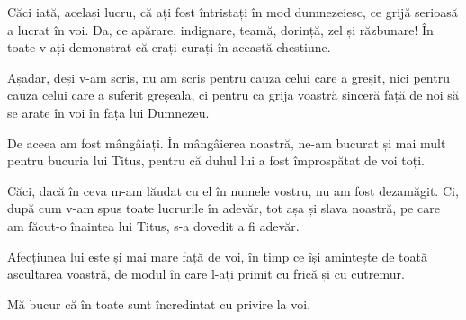 {Căci iată, același lucru, că ați fost întristați în mod dumnezeiesc, ce grijă serioasă a lucrat în voi. Da, ce apărare, indignare, teamă, dorință, zel și răzbunare! În toate v-ați demonstrat că erați curați în această chestiune.

Așadar, deși v-am scris, nu am scris pentru cauza celui care a greșit, nici pentru cauza celui care a suferit greșeala, ci pentru ca grija voastră sinceră față de noi să se arate în voi în fața lui Dumnezeu.

De aceea am fost mângâiați. În mângâierea noastră, ne-am bucurat și mai mult pentru bucuria lui Titus, pentru că duhul lui a fost împrospătat de voi toți.

Căci, dacă în ceva m-am lăudat cu el în numele vostru, nu am fost dezamăgit. Ci, după cum v-am spus toate lucrurile în adevăr, tot așa și slava noastră, pe care am făcut-o înaintea lui Titus, s-a dovedit a fi adevăr.

Afecțiunea lui este și mai mare față de voi, în timp ce își amintește de toată ascultarea voastră, de modul în care l-ați primit cu frică și cu cutremur.

Mă bucur că în toate sunt încredințat cu privire la voi.



\par }
